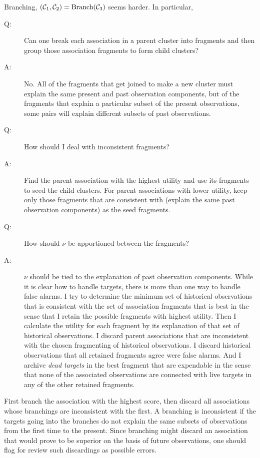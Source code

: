 \documentclass[12pt]{article}
\newcommand{\cC}{{\cal C}}
\begin{document}
Branching, $(\cC_1,\cC_2) = \text{Branch}(\cC_3)$ seems harder.  In
particular,
\begin{description}
\item[Q:] Can one break each association in a parent
  cluster into fragments and then group those association fragments to
  form child clusters?
\item[A:] No.  All of the fragments that get joined to make a new
  cluster must explain the same present and past observation
  components, but of the fragments that explain a particular subset of
  the present observations, some pairs will explain different subsets
  of past observations.
\item[Q:] How should I deal with inconsistent fragments?
\item[A:] Find the parent association with the highest utility and use
  its fragments to seed the child clusters.  For parent associations
  with lower utility, keep only those fragments that are consistent
  with (explain the same past observation components) as the seed
  fragments.
\item[Q:] How should $\nu$ be apportioned between the fragments?
\item[A:] $\nu$ should be tied to the explanation of past observation
  components.  While it is clear how to handle targets, there is more
  than one way to handle false alarms.  I try to determine the minimum
  set of historical observations that is consistent with the set of
  association fragments that is best in the sense that I retain the
  possible fragments with highest utility.  Then I calculate the
  utility for each fragment by its explanation of that set of
  historical observations.  I discard parent associations that are
  inconsistent with the chosen fragmenting of historical observations.
  I discard historical observations that all retained fragments agree
  were false alarms.  And I archive \emph{dead targets} in the best
  fragment that are expendable in the sense that none of the
  associated observations are connected with live targets in any of
  the other retained fragments.
\end{description}
First branch the association with the highest score, then discard all
associations whose branchings are inconsistent with the first.  A
branching is inconsistent if the targets going into the branches do
not explain the same subsets of observations from the first time to
the present.  Since branching might discard an association that would
prove to be superior on the basis of future observations, one should
flag for review such discardings as possible errors.
\end{document}
